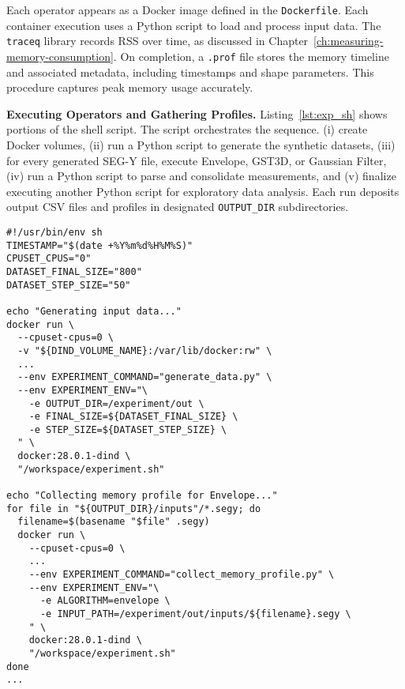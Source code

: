 Each operator appears as a Docker image defined in the \texttt{Dockerfile}.
Each container execution uses a Python script to load and process input data.
The \texttt{traceq} library records \ac{RSS} over time, as discussed in Chapter~\ref{ch:measuring-memory-consumption}.
On completion, a \texttt{.prof} file stores the memory timeline and associated metadata, including timestamps and shape parameters.
This procedure captures peak memory usage accurately.

\vspace{1em}
\noindent
\textbf{Executing Operators and Gathering Profiles.}
Listing~\ref{lst:exp_sh} shows portions of the shell script.
The script orchestrates the sequence.
(i) create Docker volumes,
(ii) run a Python script to generate the synthetic datasets,
(iii) for every generated \ac{SEG-Y} file, execute Envelope, \ac{GST3D}, or Gaussian Filter,
(iv) run a Python script to parse and consolidate measurements,
and (v) finalize executing another Python script for exploratory data analysis.
Each run deposits output \ac{CSV} files and profiles in designated \texttt{OUTPUT\_DIR} subdirectories.

\vspace{1em}
\begin{lstlisting}[style=bashstyle,caption={Excerpts from \texttt{experiment.sh}~\cite{delucca2025experiment2script} that orchestrate Docker-based runs. Variables like \texttt{DATASET\_FINAL\_SIZE} and \texttt{DATASET\_STEP\_SIZE} define shape ranges for dataset generation.}, label={lst:exp_sh}]
#!/usr/bin/env sh
TIMESTAMP="$(date +%Y%m%d%H%M%S)"
CPUSET_CPUS="0"
DATASET_FINAL_SIZE="800"
DATASET_STEP_SIZE="50"

echo "Generating input data..."
docker run \
  --cpuset-cpus=0 \
  -v "${DIND_VOLUME_NAME}:/var/lib/docker:rw" \
  ...
  --env EXPERIMENT_COMMAND="generate_data.py" \
  --env EXPERIMENT_ENV="\
    -e OUTPUT_DIR=/experiment/out \
    -e FINAL_SIZE=${DATASET_FINAL_SIZE} \
    -e STEP_SIZE=${DATASET_STEP_SIZE} \
  " \
  docker:28.0.1-dind \
  "/workspace/experiment.sh"

echo "Collecting memory profile for Envelope..."
for file in "${OUTPUT_DIR}/inputs"/*.segy; do
  filename=$(basename "$file" .segy)
  docker run \
    --cpuset-cpus=0 \
    ...
    --env EXPERIMENT_COMMAND="collect_memory_profile.py" \
    --env EXPERIMENT_ENV="\
      -e ALGORITHM=envelope \
      -e INPUT_PATH=/experiment/out/inputs/${filename}.segy \
    " \
    docker:28.0.1-dind \
    "/workspace/experiment.sh"
done
...
\end{lstlisting}


